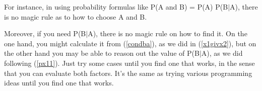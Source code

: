 \begin{itemize}
For instance, in using probability formulas like P(A and B) = P(A)
P(B$|$A), there is no magic rule as to how to choose A and B.  

Moreover, if you need P(B$|$A), there is no magic rule on how to find
it.  On the one hand, you might calculate it from (\ref{condba}), as we
did in (\ref{x1givx2}), but on the other hand you may be able to reason
out the value of P(B$|$A), as we did following (\ref{px11}).  Just try
some cases until you find one that works, in the sense that you can
evaluate both factors.  It's the same as trying various programming
ideas until you find one that works.

\end{itemize}

% 
% 
% 
% 
% 
% 
% 
% 
% 
% 
% 
% 
